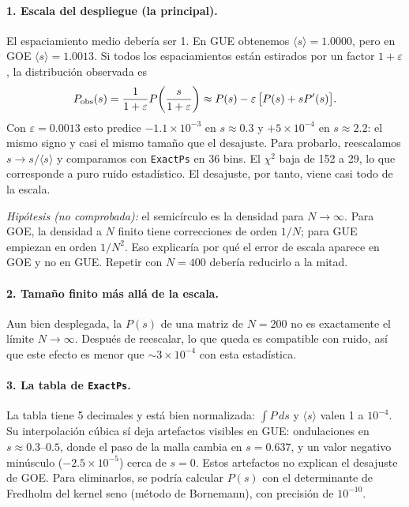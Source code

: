 \documentclass[10pt]{article}
\begin{document}
\paragraph{1. Escala del despliegue (la principal).} El espaciamiento medio
debería ser 1. En GUE obtenemos $\langle s\rangle=1.0000$, pero en GOE
$\langle s\rangle=1.0013$. Si todos los espaciamientos están estirados por un
factor $1+\varepsilon$, la distribución observada es
\begin{equation}
  P_{\rm obs}(s)=\frac{1}{1+\varepsilon}P\!\left(\frac{s}{1+\varepsilon}\right)
  \approx P(s)-\varepsilon\,\big[P(s)+sP'(s)\big].
\end{equation}
Con $\varepsilon=0.0013$ esto predice $-1.1\times10^{-3}$ en $s\approx0.3$ y
$+5\times10^{-4}$ en $s\approx2.2$: el mismo signo y casi el mismo tamaño que
el desajuste. Para probarlo, reescalamos $s\to s/\langle s\rangle$ y
comparamos con \texttt{ExactPs} en 36 bins. El $\chi^2$ baja de 152 a 29, lo
que corresponde a puro ruido estadístico. El desajuste, por tanto, viene casi
todo de la escala.

\emph{Hipótesis (no comprobada):} el semicírculo es la densidad para
$N\to\infty$. Para GOE, la densidad a $N$ finito tiene correcciones de orden
$1/N$; para GUE empiezan en orden $1/N^2$. Eso explicaría por qué el error de
escala aparece en GOE y no en GUE. Repetir con $N=400$ debería reducirlo a la
mitad.

\paragraph{2. Tamaño finito más allá de la escala.} Aun bien desplegada, la
$P(s)$ de una matriz de $N=200$ no es exactamente el límite $N\to\infty$.
Después de reescalar, lo que queda es compatible con ruido, así que este efecto
es menor que $\sim3\times10^{-4}$ con esta estadística.

\paragraph{3. La tabla de \texttt{ExactPs}.} La tabla tiene 5 decimales y
está bien normalizada: $\int P\,ds$ y $\langle s\rangle$ valen 1 a
$10^{-4}$. Su interpolación cúbica sí deja artefactos visibles en GUE:
ondulaciones en $s\approx0.3$--$0.5$, donde el paso de la malla cambia en
$s=0.637$, y un valor negativo minúsculo ($-2.5\times10^{-5}$) cerca de
$s=0$. Estos artefactos no explican el desajuste de GOE. Para eliminarlos,
se podría calcular $P(s)$ con el determinante de Fredholm del kernel seno
(método de Bornemann), con precisión de $10^{-10}$.
\end{document}
